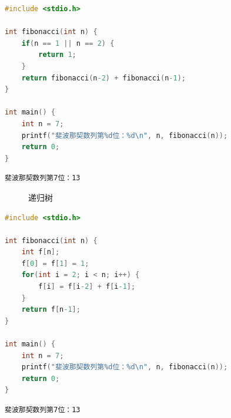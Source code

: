 
\begin{lstlisting}[language=C]
#include <stdio.h>

int fibonacci(int n) {
    if(n == 1 || n == 2) {
        return 1;
    }
    return fibonacci(n-2) + fibonacci(n-1);
}

int main() {
    int n = 7;
    printf("斐波那契数列第%d位：%d\n", n, fibonacci(n));
    return 0;
}
\end{lstlisting}

\begin{tcolorbox}
	\begin{verbatim}
斐波那契数列第7位：13
	\end{verbatim}
\end{tcolorbox}

\begin{figure}[H]
	\centering
	\caption{递归树}
\end{figure}


\begin{lstlisting}[language=C]
#include <stdio.h>

int fibonacci(int n) {
    int f[n];
    f[0] = f[1] = 1;
    for(int i = 2; i < n; i++) {
        f[i] = f[i-2] + f[i-1];
    }
    return f[n-1];
}

int main() {
    int n = 7;
    printf("斐波那契数列第%d位：%d\n", n, fibonacci(n));
    return 0;
}
\end{lstlisting}

\begin{tcolorbox}
	\begin{verbatim}
斐波那契数列第7位：13
	\end{verbatim}
\end{tcolorbox}

